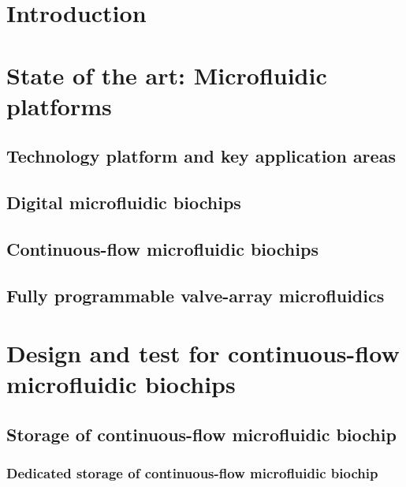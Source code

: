 \documentclass{article}
\begin{document}
\tableofcontents
\newpage

\section{Introduction}



\section{State of the art: Microfluidic platforms}
\subsection{Technology platform and key application areas}
\subsection{Digital microfluidic biochips}
\subsection{Continuous-flow microfluidic biochips}
\subsection{Fully programmable valve-array microfluidics}



\section{Design and test for continuous-flow microfluidic biochips}
  \subsection{Storage of continuous-flow microfluidic biochip}
  \subsubsection{Dedicated storage of continuous-flow microfluidic biochip}
\end{document}

